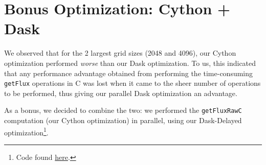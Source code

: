 \documentclass[a4paper,10pt]{article}
\begin{document}
\section{Bonus Optimization: Cython + Dask}
We observed that for the 2 largest grid sizes (2048 and 4096), our Cython optimization performed \emph{worse} than our Dask optimization.
To us, this indicated that any performance advantage obtained from performing the time-consuming \verb|getFlux| operations in C was lost when it came to the sheer number of operations to be performed, thus giving our parallel Dask optimization an advantage.

As a bonus, we decided to combine the two: we performed the \verb|getFluxRawC| computation (our Cython optimization) in parallel, using our Dask-Delayed optimization\footnote{Code found \href{https://github.com/paulmyr/DD2358-HPC25/blob/master/10_project_rishi_paul/code/cython/finitevolume_cython_dask.py\#L305}{here}.}.
\end{document}
